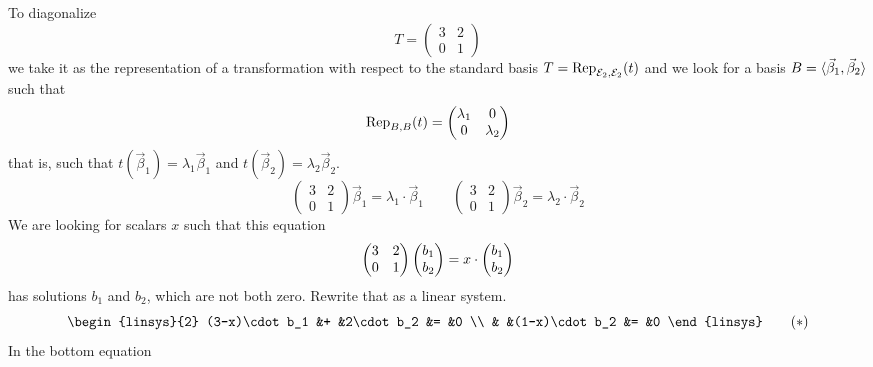 \begin{example}     \label{ex:DiagUpperTrian}
To diagonalize
\begin{equation*}
   T=\begin{pmatrix}
      3  &2  \\
      0  &1
   \end{pmatrix}
\end{equation*}
we take it as the representation of a transformation with respect to the
standard basis $T=\rep{t}{\stdbasis_2,\stdbasis_2}$ and we look for a basis
\( B=\sequence{\vec{\beta}_1,\vec{\beta}_2} \) such that
\begin{equation*}
  \rep{t}{B,B}
  =
  \begin{pmatrix}
    \lambda_1  &0          \\
    0          &\lambda_2
  \end{pmatrix}
\end{equation*}
that is, such that 
$t(\vec{\beta}_1)=\lambda_1\vec{\beta}_1$ 
and $t(\vec{\beta}_2)=\lambda_2\vec{\beta}_2$.
\begin{equation*}
  \begin{pmatrix}
     3  &2  \\
     0  &1
  \end{pmatrix}
  \vec{\beta}_1=\lambda_1\cdot\vec{\beta}_1
  \qquad
  \begin{pmatrix}
     3  &2  \\
     0  &1
  \end{pmatrix}
  \vec{\beta}_2=\lambda_2\cdot\vec{\beta}_2
\end{equation*} 
We are looking for scalars \( x \) such that this equation
\begin{equation*}
 \begin{pmatrix}
    3  &2  \\
    0  &1
 \end{pmatrix}
 \colvec{b_1 \\ b_2}=x\cdot\colvec{b_1 \\ b_2}
\end{equation*}
has solutions $b_1$ and $b_2$, which are not both zero.
Rewrite that as a linear system.
\begin{equation*}
  \begin{linsys}{2}
     (3-x)\cdot b_1  &+  &2\cdot b_2       &=  &0  \\
                     &   &(1-x)\cdot b_2   &=  &0 
  \end{linsys}
\tag*{($*$)}\end{equation*}
In the bottom equation

\end{example}
